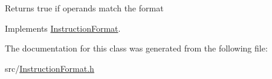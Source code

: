 Returns true if operands match the format 

Implements \hyperlink{classInstructionFormat_a9fdcf94dcd7d9a55ba86e7a63f04d1fe}{Instruction\+Format}.



The documentation for this class was generated from the following file\+:\begin{DoxyCompactItemize}
\item 
src/\hyperlink{InstructionFormat_8h}{Instruction\+Format.\+h}\end{DoxyCompactItemize}
